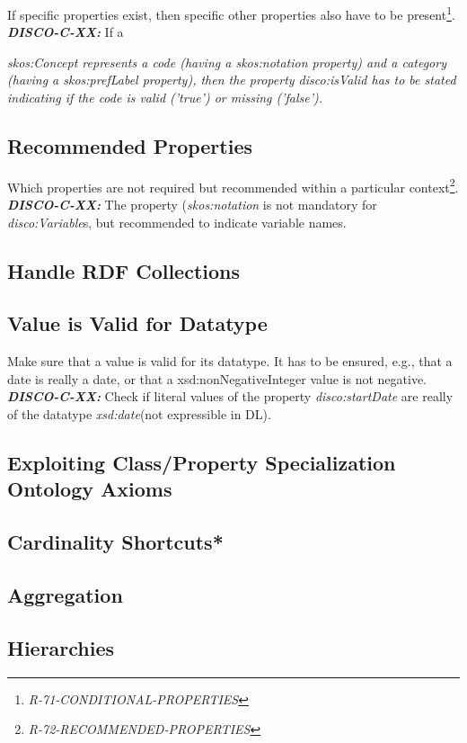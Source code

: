 \documentclass{llncs}
\begin{document}
If specific properties exist, then specific other properties also have to be present\footnote{{\em R-71-CONDITIONAL-PROPERTIES}}.
\textbf{{\em DISCO-C-XX:}}
If a {\em skos:Concept represents a code (having a {\em skos:notation} property) and a category (having a {\em skos:prefLabel} property), 
then the property {\em disco:isValid} has to be stated indicating if the code is valid ('true') or missing ('false').

\subsection{Recommended Properties}

Which properties are not required but recommended within a particular context\footnote{{\em R-72-RECOMMENDED-PROPERTIES}}.
\textbf{{\em DISCO-C-XX:}}
The property ({\em skos:notation} is not mandatory for {\em disco:Variable}s, but recommended to indicate variable names.

\subsection{Handle RDF Collections}

\subsection{Value is Valid for Datatype}

Make sure that a value is valid for its datatype.
It has to be ensured, e.g., that a date is really a date, or that a xsd:nonNegativeInteger value is not negative. 
\textbf{{\em DISCO-C-XX:}}
Check if literal values of the property {\em disco:startDate} are really of the datatype {\em xsd:date}(not expressible in DL).

\subsection{Exploiting Class/Property Specialization Ontology Axioms}

\subsection{Cardinality Shortcuts*}

\subsection{Aggregation}

\subsection{Hierarchies}

}
\end{document}
